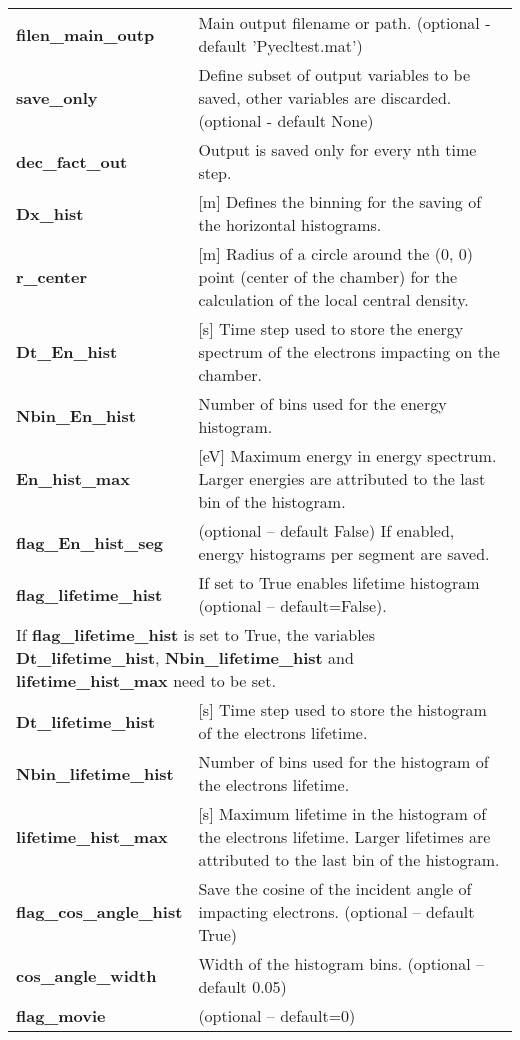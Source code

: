 \documentclass[a4paper,12pt]{article}
\begin{document}
\begin{longtable}{p{}p{}}
\hline\endfirsthead\hline\endhead\rowcolor{Gray}
\multicolumn{2}{p{.97\textwidth}}{
\textbf{Saving settings}
}\\ \hline
    \textbf{filen\_main\_outp} & Main output filename or path. (optional - default 'Pyecltest.mat') \\ \hline
    \textbf{save\_only} & Define subset of output variables to be saved, other variables are discarded. (optional - default None) \\ \hline
    \textbf{dec\_fact\_out} & Output is saved only for every nth time step. \\ \hline
\textbf{Dx\_hist}& 	[m] Defines the binning for the saving of the horizontal histograms.\\ \hline
\textbf{r\_center}&	[m] Radius of a circle around the (0, 0) point (center of the chamber) for the calculation of the local central density.\\ \hline
\textbf{Dt\_En\_hist}&	[s] Time step used to store the energy spectrum  of the electrons impacting on the chamber.\\ \hline
\textbf{Nbin\_En\_hist}&	Number of bins used for the energy histogram.\\ \hline
\textbf{En\_hist\_max}& 	[eV] Maximum energy in energy spectrum. Larger energies are attributed to the last bin of the histogram.	\\ \hline
\textbf{flag\_En\_hist\_seg}& (optional -- default False) If enabled, energy histograms per segment are saved.	\\ \hline
\textbf{flag\_lifetime\_hist}&   If set to True enables lifetime histogram (optional -- default=False).\\ \hline
\multicolumn{2}{p{.97\textwidth}}{If \textbf{flag\_lifetime\_hist} is set to True, the variables \textbf{Dt\_lifetime\_hist}, \textbf{Nbin\_lifetime\_hist} and \textbf{lifetime\_hist\_max} need to be set.}\\ \hline
\textbf{Dt\_lifetime\_hist}&	[s] Time step used to store the histogram of the electrons lifetime.\\ \hline
\textbf{Nbin\_lifetime\_hist}&	Number of bins used for the histogram of the electrons lifetime.\\ \hline
\textbf{lifetime\_hist\_max}& 	[s] Maximum lifetime in the histogram of the electrons lifetime. Larger lifetimes are attributed to the last bin of the histogram.	\\ \hline
\textbf{flag\_cos\_angle\_hist} & Save the cosine of the incident angle of impacting electrons. (optional -- default True) \\ \hline
\textbf{cos\_angle\_width} & Width of the histogram bins. (optional -- default 0.05) \\ \hline
\textbf{flag\_movie}&	(optional -- default=0)


\end{longtable}
\end{document}
